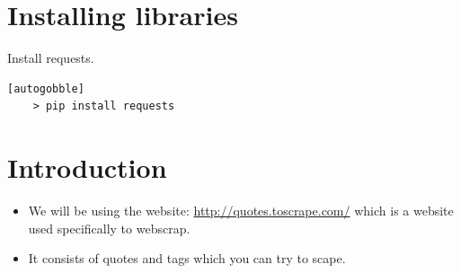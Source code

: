 \section{Installing libraries}
Install requests.
\begin{verbatim}[autogobble]
    > pip install requests
\end{verbatim}

\section{Introduction}
\begin{itemize}
    \item We will be using the website: \url{http://quotes.toscrape.com/} which is a website used specifically to webscrap. 
    \item It consists of quotes and tags which you can try to scape.
\end{itemize}

